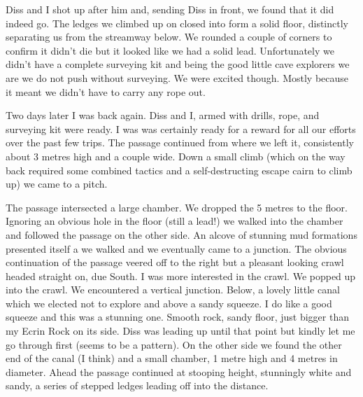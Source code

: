 Diss and I shot up after him and, sending Diss in front, we found that it did indeed go. The ledges we climbed up on closed into form a solid floor, distinctly separating us from the streamway below. We rounded a couple of corners to confirm it didn’t die but it looked like we had a solid lead. Unfortunately we didn’t have a complete surveying kit and being the good little cave explorers we are we do not push without surveying. We were excited though. Mostly because it meant we didn’t have to carry any rope out.
 
Two days later I was back again. Diss and I, armed with drills, rope, and surveying kit were ready. I was was certainly ready for a reward for all our efforts over the past few trips. The passage continued from where we left it, consistently about 3 metres high and a couple wide. Down a small climb (which on the way back required some combined tactics and a self-destructing escape cairn to climb up) we came to a pitch.
 \begin{marginfigure}
\end{marginfigure}  
The passage intersected a large chamber. We dropped the 5 metres to the floor. Ignoring an obvious hole in the floor (still a lead!) we walked into the chamber and followed the passage on the other side. An alcove of stunning mud formations presented itself a we walked and we eventually came to a junction. The obvious continuation of the passage veered off to the right but a pleasant looking crawl headed straight on, due South. I was more interested in the crawl.  
We popped up into the crawl. We encountered a vertical junction. Below, a lovely little canal which we elected not to explore and above a sandy squeeze. I do like a good squeeze and this was a stunning one. Smooth rock, sandy floor, just bigger than my Ecrin Rock on its side. Diss was leading up until that point but kindly let me go through first (seems to be a pattern). On the other side we found the other end of the canal (I think) and a small chamber, 1 metre high and 4 metres in diameter. Ahead the passage continued at stooping height, stunningly white and sandy, a series of stepped ledges leading off into the distance.
 
